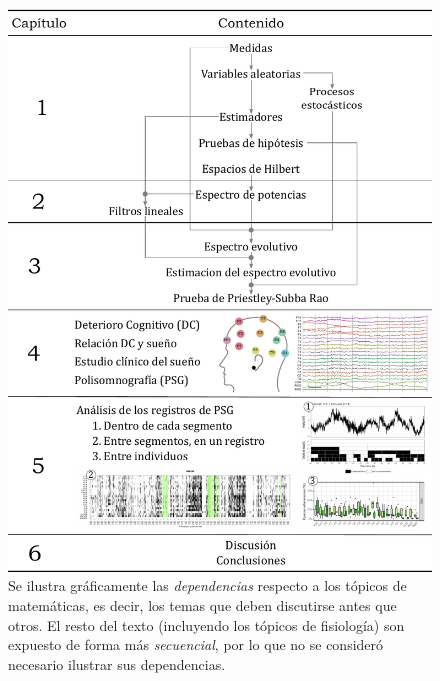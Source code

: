 \begin{figure}
\centering
\includegraphics[width=.9\textwidth]{./estructura_texto_v2.pdf}
\caption[Estructura de la tesis]{Se ilustra gráficamente las \textit{dependencias} respecto a los tópicos de matemáticas, es decir, los temas que deben discutirse antes que otros. El resto del texto (incluyendo los tópicos de fisiología) son expuesto de forma más \textit{secuencial}, por lo que no se consideró necesario ilustrar sus dependencias.}
\label{intro:estructura}
\end{figure}

